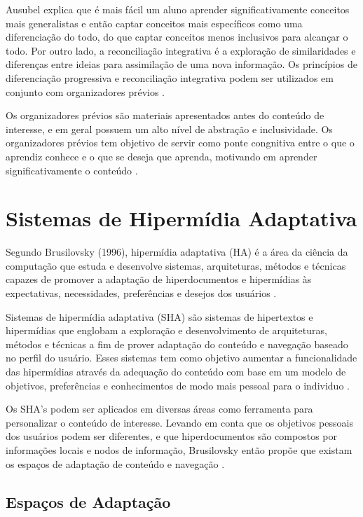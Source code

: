 Ausubel explica que é mais fácil um aluno aprender significativamente conceitos mais generalistas e então captar conceitos mais específicos como uma diferenciação do todo, do que captar conceitos menos inclusivos para alcançar o todo. Por outro lado, a reconciliação integrativa é a exploração  de similaridades e diferenças entre ideias para assimilação de uma nova informação. Os princípios de diferenciação progressiva e reconciliação integrativa podem ser utilizados em conjunto com organizadores prévios \cite{fragelli2010}.

Os organizadores prévios são materiais apresentados antes do conteúdo de interesse, e em geral possuem um alto nível de abstração e inclusividade. Os organizadores prévios tem objetivo de servir como ponte congnitiva entre o que o aprendiz conhece e o que se deseja que aprenda, motivando em aprender significativamente o conteúdo \cite{ausubel2000, tavares2010}.

\section{Sistemas de Hipermídia Adaptativa}

Segundo Brusilovsky (1996), hipermídia adaptativa (HA) é a área da ciência da computação que estuda e desenvolve sistemas, arquiteturas, métodos e técnicas capazes de promover a adaptação de hiperdocumentos e hipermídias às expectativas, necessidades, preferências e desejos dos usuários \cite{diniz2011, diniz2012}.

Sistemas de hipermídia adaptativa (SHA) são sistemas de hipertextos e hipermídias que englobam a exploração e desenvolvimento de arquiteturas, métodos e técnicas a fim de prover adaptação do conteúdo e navegação baseado no perfil do usuário. Esses sistemas tem como objetivo aumentar a funcionalidade das hipermídias através da adequação do conteúdo com base em um modelo de objetivos, preferências e conhecimentos de modo mais pessoal para o individuo \cite{brusilovsky1996, fragelli2010}.

Os SHA's podem ser aplicados em diversas áreas como ferramenta para personalizar o conteúdo de interesse. Levando em conta que os objetivos pessoais dos usuários podem ser diferentes, e que hiperdocumentos são compostos por informações locais e nodos de informação, Brusilovsky então propõe que  existam os espaços de adaptação de conteúdo e navegação \cite{brusilovsky1996}.

\subsection{Espaços de Adaptação}

